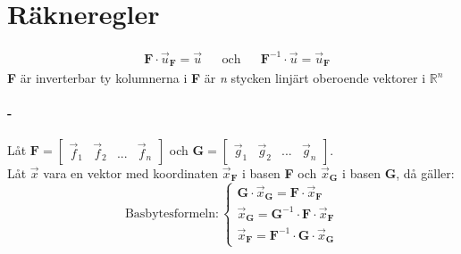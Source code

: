 \section{Räkneregler} %
\label{sec:r_kneregler}
\begin{align*}
&\mathbf{F} \cdot \vec{u}_{\mathbf{F}} = \vec{u}
&&\mbox{och}
&&\mathbf{F}^{-1} \cdot \vec{u} = \vec{u}_\mathbf{F}
\end{align*}
\textbf{F} är inverterbar ty kolumnerna i \textbf{F} är \textit{n} stycken linjärt oberoende vektorer i $\mathbb{R}^n$
\paragraph{-} %
\label{par:_2}
Låt $\mathbf{F} = \begin{bmatrix} \vec{f}_1 & \vec{f}_2 & ... & \vec{f}_n \end{bmatrix}$ och $\mathbf{G} = \begin{bmatrix} \vec{g}_1 & \vec{g}_2 & ... & \vec{g}_n \end{bmatrix}$.\\
Låt $\vec{x}$ vara en vektor med koordinaten $\vec{x}_\mathbf{F}$ i basen \textbf{F} och $\vec{x}_\mathbf{G}$ i basen \textbf{G}, då gäller:
\[
\text{Basbytesformeln}: 
\begin{cases}
	\mathbf{G} \cdot \vec{x}_{\mathbf{G}} = \mathbf{F} \cdot \vec{x}_\mathbf{F}\\
	\vec{x}_{\mathbf{G}} = \mathbf{G}^{-1} \cdot \mathbf{F} \cdot \vec{x}_{\mathbf{F}}\\
	\vec{x}_{\mathbf{F}} = \mathbf{F}^{-1} \cdot \mathbf{G} \cdot \vec{x}_{\mathbf{G}}
\end{cases}
\]
